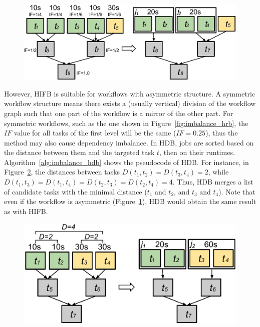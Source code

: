 \documentclass[final,5p,times,twocolumn]{elsarticle}
\begin{document}
\begin{figure}[htb]
	\centering
	\includegraphics[width=\linewidth]{figure9.eps}
	\label{fig:imbalance_hifb}
\end{figure}

However, HIFB is suitable for workflows with asymmetric structure. A symmetric workflow structure means there exists a (usually vertical) division of the workflow graph such that one part of the workflow is a mirror of the other part. For symmetric workflows, such as the one shown in Figure~\ref{fig:imbalance_hrb}, the $IF$ value for all tasks of the first level will be the same ($IF=0.25$), thus the method may also cause dependency imbalance. In HDB, jobs are sorted based on the distance between them and the targeted task $t$, then on their runtimes. 
Algorithm~\ref{alg:imbalance_hdb} shows the pseudocode of HDB. 
For instance, in Figure~\ref{fig:imbalance_hdb}, the distances between tasks $D(t_1,t_2)=D(t_3,t_4)=2$, while $D(t_1,t_3)=D(t_1,t_4)=D(t_2,t_3)=D(t_2,t_4)=4$. Thus, HDB merges a list of candidate tasks with the minimal distance ($t_1$ and $t_2$, and $t_3$ and $t_4$). Note that even if the workflow is asymmetric (Figure~\ref{fig:imbalance_hifb}), HDB would obtain the same result as with HIFB. 

\begin{figure}[!htb]
	\centering
	\includegraphics[width=0.85\linewidth]{figure10.eps}
	\label{fig:imbalance_hdb}
\end{figure}
\end{document}
